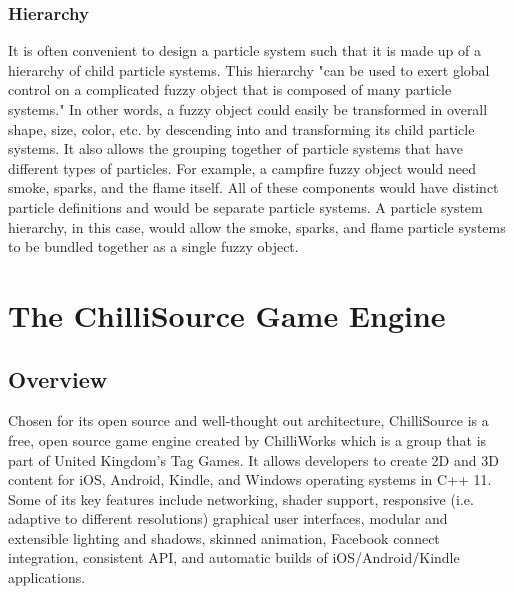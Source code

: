 \subsubsection{Hierarchy}

It is often convenient to design a particle system such that it is made up of a hierarchy of child particle systems. This hierarchy "can be used to exert global control on a complicated fuzzy object that is composed of many particle systems." \cite{Reeves1983ParticleSystems} In other words, a fuzzy object could easily be transformed in overall shape, size, color, etc. by descending into and transforming its child particle systems. It also allows the grouping together of particle systems that have different types of particles. For example, a campfire fuzzy object would need smoke, sparks, and the flame itself. All of these components would have distinct particle definitions and would be separate particle systems. A particle system hierarchy, in this case, would allow the smoke, sparks, and flame particle systems to be bundled together as a single fuzzy object.


\section{The ChilliSource Game Engine}\label{sec:cs_engine}

\subsection{Overview}\label{ssec:cs_engine_overview}

Chosen for its open source and well-thought out architecture, ChilliSource is a free, open source game engine created by ChilliWorks which is a group that is part of United Kingdom's Tag Games. It allows developers to create 2D and 3D content for iOS, Android, Kindle, and Windows operating systems in C++ 11. Some of its key features include networking, shader support, responsive (i.e. adaptive to different resolutions) graphical user interfaces, modular and extensible lighting and shadows, skinned animation, Facebook connect integration, consistent API, and automatic builds of iOS/Android/Kindle applications. \cite{ChilliSource2014Features}


